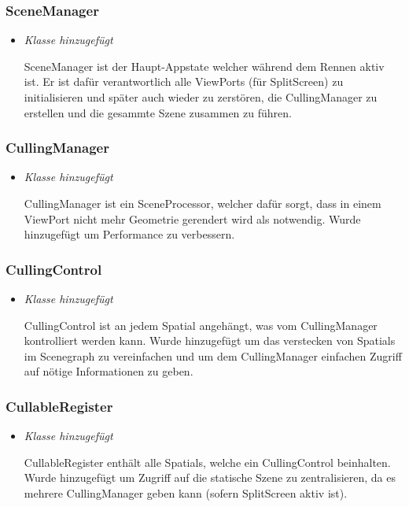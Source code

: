 \subsubsection{SceneManager}
\begin{itemize}
    \item \textit{Klasse hinzugefügt}
    \begin{leftbar}[0.9\linewidth]
        SceneManager ist der Haupt-Appstate welcher während dem Rennen aktiv ist.
        Er ist dafür verantwortlich alle ViewPorts (für SplitScreen) zu initialisieren
        und später auch wieder zu zerstören, die CullingManager zu erstellen und die gesammte
        Szene zusammen zu führen.
    \end{leftbar}
\end{itemize}

\subsubsection{CullingManager}
\begin{itemize}
    \item \textit{Klasse hinzugefügt}
    \begin{leftbar}[0.9\linewidth]
        CullingManager ist ein SceneProcessor, welcher dafür sorgt,
        dass in einem ViewPort nicht mehr Geometrie gerendert wird als notwendig.
        Wurde hinzugefügt um Performance zu verbessern.
    \end{leftbar}
\end{itemize}

\subsubsection{CullingControl}
\begin{itemize}
    \item \textit{Klasse hinzugefügt}
    \begin{leftbar}[0.9\linewidth]
        CullingControl ist an jedem Spatial angehängt, was vom CullingManager kontrolliert werden kann.
        Wurde hinzugefügt um das verstecken von Spatials im Scenegraph zu vereinfachen und um dem
        CullingManager einfachen Zugriff auf nötige Informationen zu geben.
    \end{leftbar}
\end{itemize}

\subsubsection{CullableRegister}
\begin{itemize}
    \item \textit{Klasse hinzugefügt}
    \begin{leftbar}[0.9\linewidth]
        CullableRegister enthält alle Spatials, welche ein CullingControl beinhalten.
        Wurde hinzugefügt um Zugriff auf die statische Szene zu zentralisieren, da es mehrere
        CullingManager geben kann (sofern SplitScreen aktiv ist).
    \end{leftbar}
\end{itemize}
